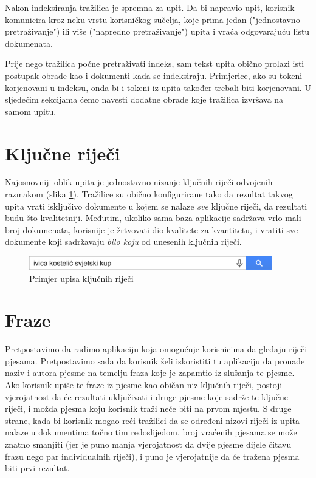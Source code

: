 \documentclass[a4paper,twoside,12pt]{memoir}
\begin{document}

Nakon indeksiranja tražilica je spremna za upit. Da bi napravio upit, korisnik komunicira kroz neku vrstu korisničkog sučelja, koje prima jedan ("jednostavno pretraživanje") ili više ("napredno pretraživanje") upita i vraća odgovarajuću listu dokumenata.

Prije nego tražilica počne pretraživati indeks, sam tekst upita obično prolazi isti postupak obrade kao i dokumenti kada se indeksiraju. Primjerice, ako su tokeni korjenovani u indeksu, onda bi i tokeni iz upita također trebali biti korjenovani. U sljedećim sekcijama ćemo navesti dodatne obrade koje tražilica izvršava na samom upitu.

\section{Ključne riječi}

Najosnovniji oblik upita je jednostavno nizanje ključnih riječi odvojenih razmakom (slika \ref{keywords}). Tražilice su obično konfigurirane tako da rezultat takvog upita vrati isključivo dokumente u kojem se nalaze \textit{sve} ključne riječi, da rezultati budu što kvalitetniji. Međutim, ukoliko sama baza aplikacije sadržava vrlo mali broj dokumenata, korisnije je žrtvovati dio kvalitete za kvantitetu, i vratiti sve dokumente koji sadržavaju \textit{bilo koju} od unesenih ključnih riječi.

\begin{figure}[H]
  \centering
  \includegraphics[width=300pt]{keywords}
  \caption{Primjer upisa ključnih riječi}
  \label{keywords}
\end{figure}

\section{Fraze}

Pretpostavimo da radimo aplikaciju koja omogućuje korisnicima da gledaju riječi pjesama. Pretpostavimo sada da korisnik želi iskoristiti tu aplikaciju da pronađe naziv i autora pjesme na temelju fraza koje je zapamtio iz slušanja te pjesme. Ako korisnik upiše te fraze iz pjesme kao običan niz ključnih riječi, postoji vjerojatnost da će rezultati uključivati i druge pjesme koje sadrže te ključne riječi, i možda pjesma koju korisnik traži neće biti na prvom mjestu. S druge strane, kada bi korisnik mogao reći tražilici da se određeni nizovi riječi iz upita nalaze u dokumentima točno tim redoslijedom, broj vraćenih pjesama se može znatno smanjiti (jer je puno manja vjerojatnost da dvije pjesme dijele čitavu frazu nego par individualnih riječi), i puno je vjerojatnije da će tražena pjesma biti prvi rezultat.
\end{document}
